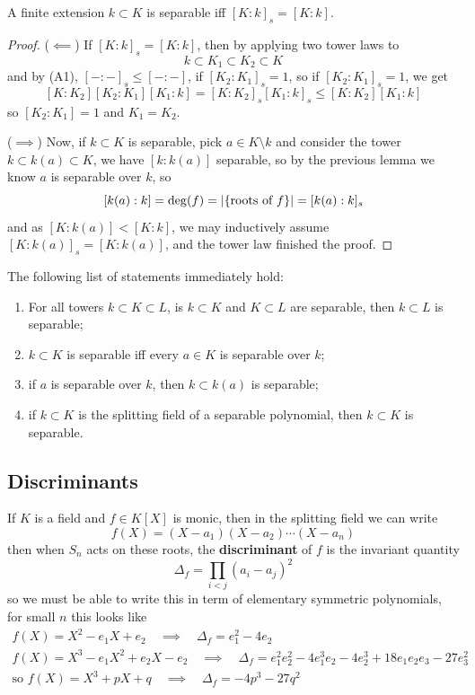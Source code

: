 \documentclass{article}
\begin{document}
\begin{theorem}
    A finite extension $k\subset K$ is separable iff $[K:k]_s = [K:k]$.
    \begin{proof}
        ($\impliedby$) If $[K:k]_s = [K:k]$, then by applying two tower laws to \[
        k \subset K_1 \subset K_2 \subset K
        \] and by (A1), $[-:-]_s\leq [-:-]$, if $[K_2:K_1]_s = 1$, so if $[K_2:K_1]_s = 1$, we get \[
        [K:K_2][K_2:K_1][K_1:k] = [K:K_2]_s[K_1:k]_s \leq [K:K_2][K_1:k]
        \] so $[K_2:K_1]=1$ and $K_1 = K_2$.

        ($\implies$) Now, if $k\subset K$ is separable, pick $a\in K\setminus k$ and consider the tower $k\subset k(a) \subset K$, we have $[k:k(a)]$ separable, so by the previous lemma we know $a$ is separable over $k$, so \[
        [k(a):k] = \deg(f) = \left| \{\text{roots of }f\} \right| = [k(a):k]_s
        \] and as $[K:k(a)]<[K:k]$, we may inductively assume $[K:k(a)]_s = [K:k(a)]$, and the tower law finished the proof.
    \end{proof}
\end{theorem}

\begin{corollary}
    The following list of statements immediately hold: \begin{enumerate}
        \item For all towers $k\subset K \subset L$, is $k\subset K$ and $K\subset L$ are separable, then $k\subset L$ is separable;
        \item $k\subset K$ is separable iff every $a\in K$ is separable over $k$;
        \item if $a$ is separable over $k$, then $k\subset k(a)$ is separable;
        \item if $k\subset K$ is the splitting field of a separable polynomial, then $k\subset K$ is separable.
    \end{enumerate}
\end{corollary}

\subsection{Discriminants}

\begin{definition}
    If $K$ is a field and $f\in K[X]$ is monic, then in the splitting field we can write \[
    f(X) = (X-a_1)(X-a_2)\cdots(X-a_n)
    \] then when $S_n$ acts on these roots, the \textbf{discriminant} of $f$ is the invariant quantity \[
    \Delta_f = \prod_{i<j}(a_i-a_j)^2
    \] so we must be able to write this in term of elementary symmetric polynomials, for small $n$ this looks like \begin{gather*}
        f(X) = X^2 - e_1X + e_2 \quad \implies \quad \Delta_f = e_1^2 - 4e_2 \\
        f(X) = X^3 - e_1X^2 + e_2X - e_2 \quad \implies \quad \Delta_f = e_1^2e_2^2 - 4e_1^3e_2 - 4e_2^3 + 18e_1e_2e_3 - 27e_3^2 \\
        \text{so } f(X) = X^3 + pX + q \quad \implies \quad \Delta_f = -4p^3 - 27q^2
    \end{gather*}
\end{definition}
\end{document}
